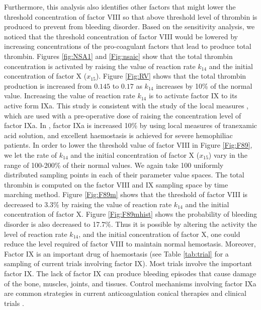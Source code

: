 Furthermore, this analysis also identifies other factors that might
lower the threshold concentration of factor VIII so that above
threshold level of thrombin is produced to prevent from bleeding
disorder. Based on the sensitivity analysis, we noticed that the
threshold concentration of factor VIII would be lowered by
increasing concentrations of the pro-coagulant factors that lead to
produce total thrombin. Figures \ref{fig:NSA1} and \ref{Fig:nsaic}
show that the total thrombin concentration is activated by raising
the value of reaction rate $k_{14}$ and the initial concentration of
factor X ($x_{15}$). Figure \ref{Fig:RV} shows that the total
thrombin production is increased from $0.145$ to $0.17$ as $k_{14}$
increases by 10\% of the normal value. Increasing the value of
reaction rate $k_{14}$ is to activate factor IX to its active form
IXa. This study is consistent with the study of the local measures
\cite{HM}, which are used with a pre-operative dose of raising the
concentration level of factor IXa. In \cite{HM}, factor IXa is
increased 10\% by using local measures of tranexamic acid solution,
and excellent haemostasis is achieved for severe hemophiliac
patients. In order to lower the threshold value of factor VIII in
Figure \ref{Fig:F89}, we let the rate of $k_{14}$ and the initial
concentration of factor X ($x_{15}$) vary in the range of 100-200\%
of their normal values. We again take 100 uniformly distributed
sampling points in each of their parameter value spaces. The total
thrombin is computed on the factor VIII and IX sampling space by
time marching method. Figure \ref{Fig:F89m} shows that the threshold
of factor VIII is decreased to 3.3\% by raising the value of
reaction rate $k_{14}$ and the initial concentration of factor X.
Figure \ref{Fig:F89mhist} shows the probability of bleeding disorder
is also decreased to 17.7\%. Thus it is possible by altering the
activity the level of reaction rate $k_{14}$, and the initial
concentration of factor X, one could reduce the level required of
factor VIII to maintain normal hemostasis. Moreover, Factor IX is an
important drug of haemostasis (see Table \ref{tab:trial} for a
sampling of current trials involving factor IX). Most trials involve
the important factor IX. The lack of factor IX can produce bleeding
episodes that cause damage of the bone, muscles, joints, and
tissues. Control mechanisms involving factor IXa are common
strategies in current anticoagulation conical therapies and clinical
trials \cite{LZV}.
